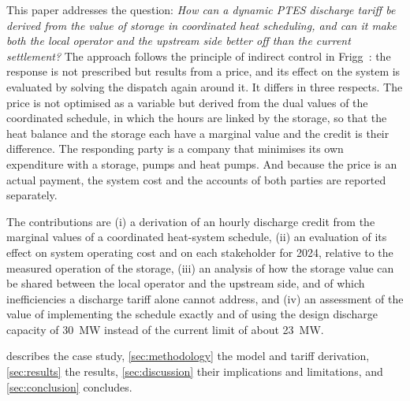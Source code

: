 This paper addresses the question: \emph{How can a dynamic PTES discharge tariff be derived from the value of storage in coordinated heat scheduling, and can it make both the local operator and the upstream side better off than the current settlement?} The approach follows the principle of indirect control in Frigg~\cite{schledorn2022a,schledorn2024frigg}: the response is not prescribed but results from a price, and its effect on the system is evaluated by solving the dispatch again around it. It differs in three respects. The price is not optimised as a variable but derived from the dual values of the coordinated schedule, in which the hours are linked by the storage, so that the heat balance and the storage each have a marginal value and the credit is their difference. The responding party is a company that minimises its own expenditure with a storage, pumps and heat pumps. And because the price is an actual payment, the system cost and the accounts of both parties are reported separately.

The contributions are (i) a derivation of an hourly discharge credit from the marginal values of a coordinated heat-system schedule, (ii) an evaluation of its effect on system operating cost and on each stakeholder for 2024, relative to the measured operation of the storage, (iii) an analysis of how the storage value can be shared between the local operator and the upstream side, and of which inefficiencies a discharge tariff alone cannot address, and (iv) an assessment of the value of implementing the schedule exactly and of using the design discharge capacity of 30~MW instead of the current limit of about 23~MW.

 describes the case study, \cref{sec:methodology} the model and tariff derivation, \cref{sec:results} the results, \cref{sec:discussion} their implications and limitations, and \cref{sec:conclusion} concludes.
